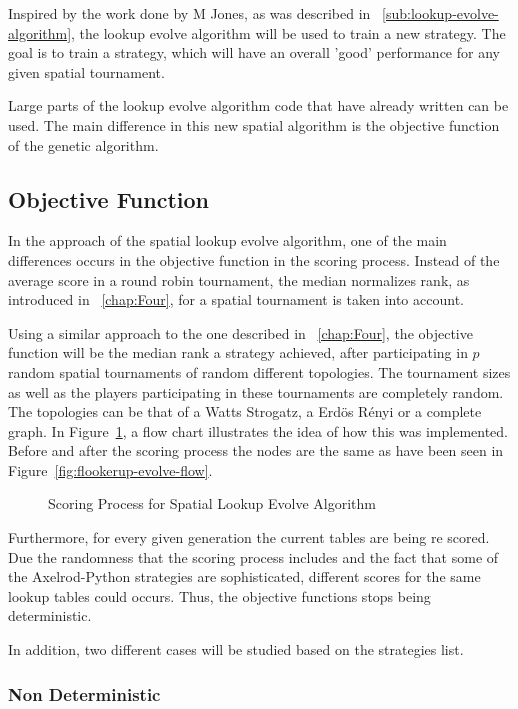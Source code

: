 Inspired by the work done by M Jones, as was described in ~\autoref{sub:lookup-evolve-algorithm},
the lookup evolve algorithm will be used to train a new strategy. The goal is to
train a strategy, which will have an overall 'good' performance for any given
spatial tournament.

Large parts of the lookup evolve algorithm code that have already written
can be used. The main difference in this new spatial algorithm is the objective
function of the genetic algorithm.
\subsection{Objective Function}

In the approach of the spatial lookup evolve algorithm, one of the main differences
occurs in the objective function in the scoring process. Instead of the average
score in a round robin tournament, the median normalizes rank, as introduced
in ~\autoref{chap:Four}, for a spatial tournament is taken into account.

Using a similar approach to the one described in ~\autoref{chap:Four}, the objective
function will be the median rank a strategy achieved, after participating in \(p\)
random spatial tournaments of random different topologies. The tournament sizes
as well as the players participating in these tournaments are completely random.
The topologies can be that of a Watts Strogatz, a Erd\"{o}s
R\'{e}nyi or a complete graph. In Figure~\ref{fig:objective}, a flow chart
illustrates the idea of how this was implemented. Before and after the scoring
process the nodes are the same as have been seen in Figure~\ref{fig:flookerup-evolve-flow}.

\begin{figure}[!hbtp]
		
		\caption{Scoring Process for Spatial Lookup Evolve Algorithm}
  \label{fig:objective}
\end{figure}


Furthermore, for every given generation the current tables are being re scored.
Due the randomness that the scoring process includes and the fact that some
of the Axelrod-Python strategies are sophisticated, different scores for the
same lookup tables could occurs. Thus, the objective functions stops being
deterministic.

In addition, two different cases will be studied based on the strategies list.

\subsubsection{Non Deterministic}

